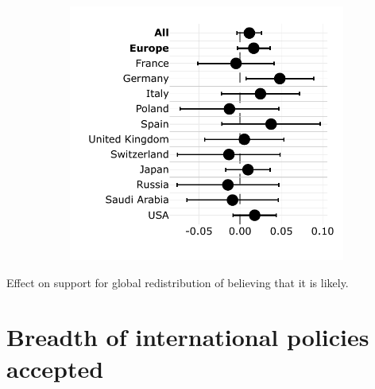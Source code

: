 \documentclass[12pt,english]{article}
\begin{document}
\begin{bibunit}
\begin{figure}[h!]
\begin{subfigure}{.49\textwidth}
  \includegraphics[height=.36\textheight]{../figures/country_comparison/share_solidarity_supported_by_info_solidarity.pdf}
\end{subfigure}
\end{figure}
\begin{table}[!htbp] 
  \caption[Effect on support for global redistribution of believing that it is likely]{Effect on support for global redistribution of believing that it is likely.}\label{tab:iv} 
  \makebox[\textwidth][c]{}
\end{table}

\section{Breadth of international policies accepted\label{sec:breadth}}


\end{bibunit}
\end{document}
